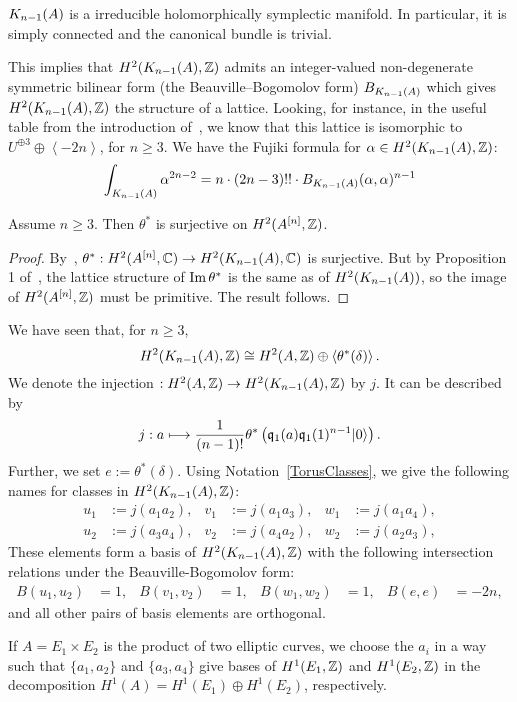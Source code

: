 \begin{theorem}\cite[Th\'eor\`eme 4]{Beauville}
$\kum{A}{n-1}$ is a irreducible holomorphically symplectic manifold. In particular, it is simply connected and the canonical bundle is trivial.
\end{theorem}
This implies that $H^2(\kum{A}{n-1},\Z)$ admits an integer-valued non-degenerate symmetric bilinear form (the Beauville--Bogomolov form) $B_{\kum{A}{n-1}}$ which gives $H^2(\kum{A}{n-1},\Z)$ the structure of a lattice. Looking, for instance, in the useful table from the introduction of~\cite{Rapagnetta}, we know that this lattice is
isomorphic to $U^{\oplus 3}\oplus \left< -2n \right>$, for $n\geq 3$. 
We have the Fujiki formula for $\alpha\in H^2(\kum{A}{n-1},\Z)$:
\begin{equation} \label{fujiki}
\int_{\kum{A}{n-1}} \alpha^{2n-2} = n\cdot(2n-3)!!\cdot B_{\kum{A}{n-1}}(\alpha,\alpha)^{n-1}
\end{equation}

\begin{proposition}\label{H2Sur} Assume $n\geq 3$. Then
$\theta^*$ is surjective on $H^2(A\hilb{n},\Z)$.
\end{proposition}
\begin{proof}
By~\cite[Sect.~7]{Beauville}, $\theta^{\ast} : H^2(A\hilb{n},\C) \rightarrow H^2(\kum{A}{n-1},\C)$ is surjective. 
But by Proposition 1 of~\cite{Britze}, the lattice structure of $\im \theta^*$ is the same as of $H^2(\kum{A}{n-1})$, so the image of $H^2(A\hilb{n},\Z)$ must be primitive. The result follows.
\end{proof}
\begin{notation}\label{BasisH2KA}
 We have seen that, for $n\geq 3$,
 $$
 H^2(\kum{A}{n-1},\Z) \cong H^2(A,\Z) \oplus\left<\theta^*(\delta)\right>.
 $$
We denote the injection $ : H^2(A,\Z) \rightarrow H^2(\kum{A}{n-1},\Z)$ by $j$. It can be described by 
$$
j : a \longmapsto \frac{1}{(n-1)!}\theta^*\left(\q_1(a)\q_1(1)^{n-1}\vac\right).
$$ 
Further, we set $e:=\theta^*(\delta)$. Using Notation~\ref{TorusClasses}, we give the following names for classes in $H^2(\kum{A}{n-1},\Z)$:
\begin{align*}
u_1 &:= j(a_1 a_2), & v_1 &:= j(a_1 a_3), & w_1 &:= j(a_1 a_4), \\ 
u_2 &:= j(a_3 a_4), & v_2 &:= j(a_4 a_2), & w_2 &:= j(a_2 a_3),
\end{align*}
These elements form a basis of $H^2(\kum{A}{n-1},\Z)$ with the following intersection relations under the Beauville-Bogomolov form:
\begin{align*}
B(u_1,u_2) &= 1, & B(v_1,v_2) &= 1, & B(w_1,w_2) &= 1,  &
B(e,e)&= -2n,
\end{align*}
and all other pairs of basis elements are orthogonal.

If $A=E_1\times E_2$ is the product of two elliptic curves, we choose the $a_i$ in a way such that $\{a_1,a_2\}$ 
and $\{a_3,a_4\}$ give bases of $H^1(E_1,\Z)$ and $H^1(E_2,\Z)$ in the decomposition $H^1(A) = H^1(E_1)\oplus H^1(E_2)$, respectively.
\end{notation}

